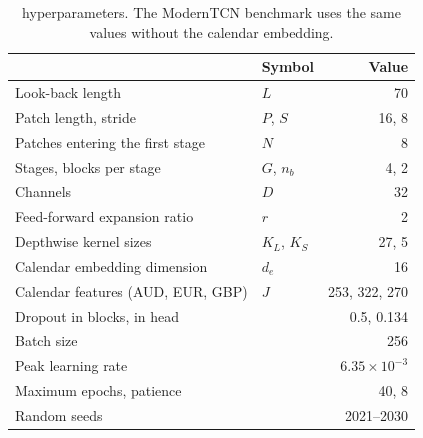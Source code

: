 \begin{table}[t]
  \centering
  \caption{\FiLMTCN{} hyperparameters. The ModernTCN benchmark uses the same
    values without the calendar embedding.}
  \label{tab:filmtcn-hparams}
  \begin{tabular}{llr}
    \toprule
    & Symbol & Value \\
    \midrule
    Look-back length                    & $L$            & 70 \\
    Patch length, stride                & $P$, $S$       & 16, 8 \\
    Patches entering the first stage    & $N$            & 8 \\
    Stages, blocks per stage            & $G$, $n_b$     & 4, 2 \\
    Channels                            & $D$            & 32 \\
    Feed-forward expansion ratio        & $r$            & 2 \\
    Depthwise kernel sizes              & $K_L$, $K_S$   & 27, 5 \\
    Calendar embedding dimension        & $d_e$          & 16 \\
    Calendar features (AUD, EUR, GBP)   & $J$            & 253, 322, 270 \\
    Dropout in blocks, in head          &                & 0.5, 0.134 \\
    Batch size                          &                & 256 \\
    Peak learning rate                  &                & $6.35\times10^{-3}$ \\
    Maximum epochs, patience            &                & 40, 8 \\
    Random seeds                        &                & 2021--2030 \\
    \bottomrule
  \end{tabular}
\end{table}
